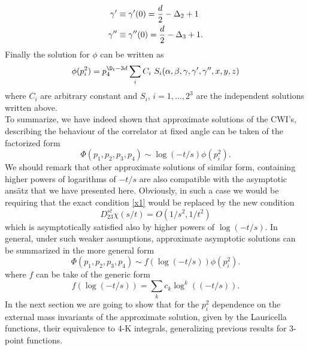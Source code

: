 \documentclass[a4paper,11pt,openright,twoside]{book}
\let\a=\alpha   \let\b=\beta   \let\g=\gamma   \let\d=\delta
\numberwithin{equation}{section}
\begin{document}
{{\begin{align}
		\g'&\equiv\g'(0)=\frac{d}{2}-\Delta_2+1\notag\\
		\g''&\equiv\g''(0)=\frac{d}{2}-\Delta_3+1.
	\end{align}
	Finally the solution for $\phi$  can be written as
	\begin{equation}
		\phi(p_i^2)=p_4^{\D_t-3d}\sum_i C_i\ S_i(\a,\b,\g,\g',\g'',x,y,z)
	\end{equation}
	where $C_i$ are arbitrary constant and $S_i$, $i=1,\dots, 2^3$ are the independent solutions written above. \\
	To summarize, we have indeed shown that approximate solutions of the CWI's, describing the behaviour of the correlator at fixed angle 
	can be taken of the factorized form 
	\begin{equation}
		\Phi(p_1,p_2,p_3,p_4)\sim \log(-t/s) \phi(p_i^2).
	\end{equation}
	We should remark that other approximate solutions of similar form, containing higher powers of logarithms of $-t/s$ are also compatible with the asymptotic ans\"atz that we have presented here. Obviously, in such a case we would be requiring that the exact condition \eqref{x1} would be replaced by the new condition 
	\begin{equation}
		D_{23}^{st}\chi(s/t)=O(1/s^2,1/t^2)  
	\end{equation}
	which is asymptotically satisfied also by higher powers of $\log(-t/s)$. In general, under such weaker assumptions, approximate asymptotic solutions can be summarized in the more general form
	\begin{equation}
		\Phi(p_1,p_2,p_3,p_4)\sim f\left(\log(-t/s) \right)\phi(p_i^2).
	\end{equation}
	where $f$ can be take of the generic form 
	\begin{equation} 
		f\left(\log(-t/s)\right) = \sum_k c_k \log^k\left((-t/s)\right).
	\end{equation}
	In the next section we are going to show that for the $p_i^2$ dependence on the external mass invariants of the approximate solution, given by the Lauricella functions, their equivalence to 4-K integrals, generalizing previous results for 3-point functions. 
}}
\end{document}
